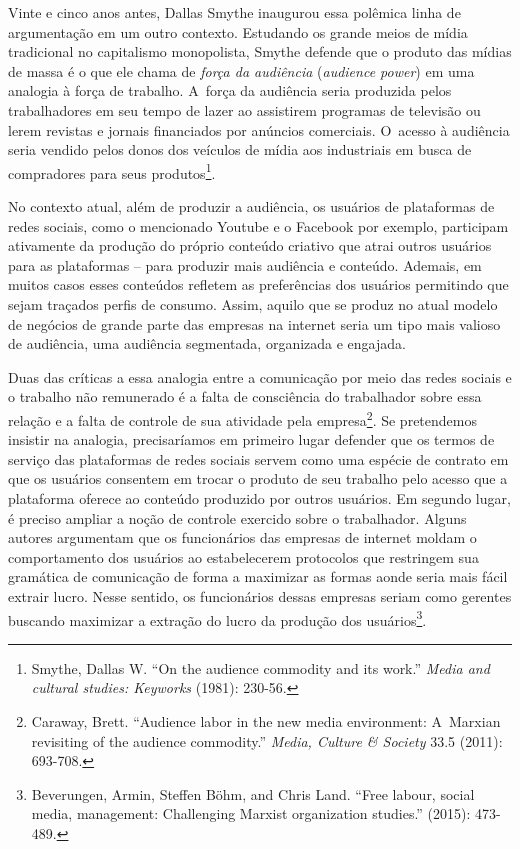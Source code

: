 Vinte e cinco anos antes, Dallas Smythe inaugurou essa polêmica linha de
argumentação em um outro contexto. Estudando os grande meios de mídia
tradicional no capitalismo monopolista, Smythe defende que o produto das
mídias de massa é o que ele chama de \emph{força da audiência}
(\emph{audience power}) em uma analogia à força de trabalho. A~força da
audiência seria produzida pelos trabalhadores em seu tempo de lazer ao
assistirem programas de televisão ou lerem revistas e jornais
financiados por anúncios comerciais. O~acesso à audiência seria vendido
pelos donos dos veículos de mídia aos industriais em busca de
compradores para seus produtos\footnote{Smythe, Dallas
  W. ``On the audience commodity and its work.'' \emph{Media and cultural
  studies: Keyworks} (1981): 230-56.}.

No contexto atual, além de produzir a audiência, os usuários de
plataformas de redes sociais, como o mencionado Youtube e o Facebook por
exemplo, participam ativamente da produção do próprio conteúdo criativo
que atrai outros usuários para as plataformas -- para produzir mais
audiência e conteúdo. Ademais, em muitos casos esses conteúdos refletem
as preferências dos usuários permitindo que sejam traçados perfis de
consumo. Assim, aquilo que se produz no atual modelo de negócios de
grande parte das empresas na internet seria um tipo mais valioso de
audiência, uma audiência segmentada, organizada e engajada.

Duas das críticas a essa analogia entre a comunicação por meio das redes
sociais e o trabalho não remunerado é a falta de consciência do
trabalhador sobre essa relação e a falta de controle de sua atividade
pela empresa\footnote{Caraway, Brett. ``Audience labor
  in the new media environment: A~Marxian revisiting of the audience
  commodity.'' \emph{Media, Culture \& Society} 33.5 (2011): 693-708.}.
Se pretendemos insistir na analogia, precisaríamos em primeiro lugar
defender que os termos de serviço das plataformas de redes sociais
servem como uma espécie de contrato em que os usuários consentem em
trocar o produto de seu trabalho pelo acesso que a plataforma oferece ao
conteúdo produzido por outros usuários. Em segundo lugar, é preciso
ampliar a noção de controle exercido sobre o trabalhador. Alguns autores
argumentam que os funcionários das empresas de internet moldam o
comportamento dos usuários ao estabelecerem protocolos que restringem
sua gramática de comunicação de forma a maximizar as formas aonde seria
mais fácil extrair lucro. Nesse sentido, os funcionários dessas empresas
seriam como gerentes buscando maximizar a extração do lucro da produção
dos usuários\footnote{Beverungen, Armin, Steffen Böhm,
  and Chris Land. ``Free labour, social media, management: Challenging
      Marxist organization studies.'' (2015): 473-489.}.

